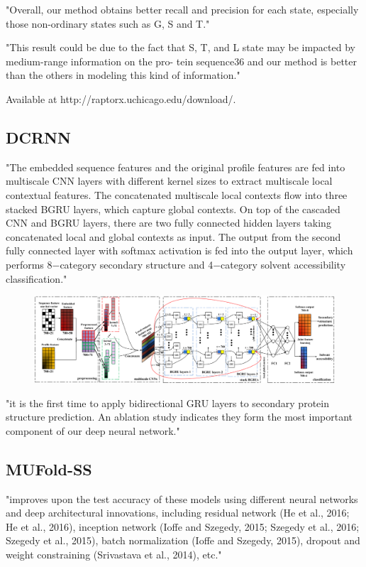 \documentclass[]{scrartcl}
\begin{document}
"Overall, our method obtains better recall and precision for each state, especially those non-ordinary states such as G, S and T." \cite{Wang2016}

"This result could be due to the fact that S, T, and L state may be impacted by medium-range information on the pro- tein sequence36 and our method is better than the others in modeling this kind of information." \cite{Wang2016}

Available at http://raptorx.uchicago.edu/download/.

\subsection{DCRNN}
"The embedded sequence features and the original profile features are fed into multiscale CNN layers with different kernel sizes to extract multiscale local contextual features. The concatenated multiscale local contexts flow into three stacked BGRU layers, which capture global contexts. On top of the cascaded CNN and BGRU layers, there are two fully connected hidden layers taking concatenated local and global contexts as input. The output from the second fully connected layer with softmax activation is fed into the output layer, which performs 8−category secondary structure and 4−category solvent accessibility classification." \cite{Li2016}
\begin{figure}[h]
	\centering
	\includegraphics[width=1\linewidth]{DCRNN}
\end{figure}

"it is the first time to apply bidirectional GRU layers to secondary protein structure prediction. An ablation study indicates they form the most important component of our deep neural network." \cite{Li2016}

\subsection{MUFold-SS}
"improves upon the test accuracy of these models using different neural networks and deep architectural innovations, including residual network (He et al., 2016; He et al., 2016), inception network (Ioffe and Szegedy, 2015; Szegedy et al., 2016; Szegedy et al., 2015), batch normalization (Ioffe and Szegedy, 2015), dropout and weight constraining (Srivastava et al., 2014), etc." \cite{Fang2017}
\end{document}
